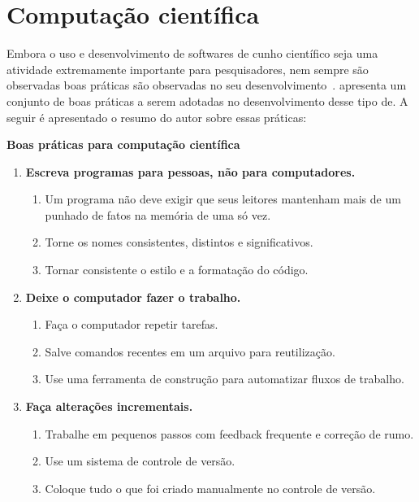 \section{Computação científica}

Embora o uso e desenvolvimento de softwares de cunho científico seja uma atividade extremamente importante para pesquisadores, nem sempre são observadas boas práticas são observadas no seu desenvolvimento~\cite{Hannay2009}.
 apresenta um conjunto de boas práticas a serem adotadas no desenvolvimento desse tipo de. A seguir é apresentado o resumo do autor sobre essas práticas:

\vspace{0.5cm}
\begin{tcolorbox}

\textbf{Boas práticas para computação científica}

\begin{enumerate}
\item \textbf{Escreva programas para pessoas, não para computadores.}
    \begin{enumerate}
        \item Um programa não deve exigir que seus leitores mantenham mais de um punhado de fatos na memória de uma só vez.
        \item Torne os nomes consistentes, distintos e significativos.
        \item Tornar consistente o estilo e a formatação do código.
    \end{enumerate}

\item \textbf{Deixe o computador fazer o trabalho.}
    \begin{enumerate}
        \item Faça o computador repetir tarefas.
        \item Salve comandos recentes em um arquivo para reutilização.
        \item Use uma ferramenta de construção para automatizar fluxos de trabalho.
    \end{enumerate}

\item \textbf{Faça alterações incrementais.}
    \begin{enumerate}
        \item Trabalhe em pequenos passos com feedback frequente e correção de rumo.
        \item Use um sistema de controle de versão.
        \item Coloque tudo o que foi criado manualmente no controle de versão.
    \end{enumerate}


\end{enumerate}
\end{tcolorbox}
